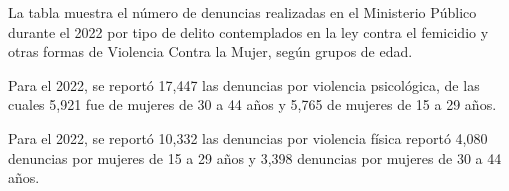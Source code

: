 La tabla muestra el número de denuncias realizadas en el Ministerio Público durante el 2022 por tipo de delito contemplados en la ley contra el femicidio y otras formas de Violencia Contra la Mujer, según grupos de edad.

Para el 2022,  se reportó 17,447 las denuncias por violencia psicológica, de las cuales 5,921 fue de mujeres de 30 a 44 años y 5,765 de mujeres de 15 a 29 años. 

Para el 2022,  se reportó 10,332 las denuncias por violencia física reportó 4,080 denuncias por mujeres de 15 a 29 años y 3,398 denuncias por mujeres de 30 a 44 años. 